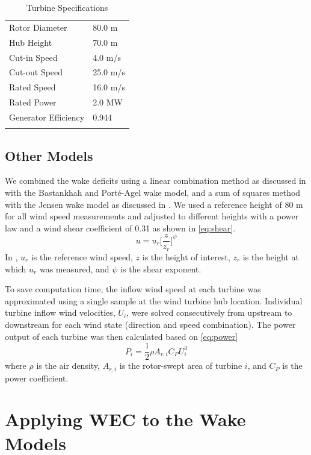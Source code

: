 \documentclass[a4paper]{jpconf}
\begin{document}
%
\begin{table}
	\caption{Turbine Specifications}
	\label{tab:v80}
	\centering
	\begin{tabular}{l l}
		\br
		Rotor Diameter & 80.0 m\\
		Hub Height & 70.0 m \\
		Cut-in Speed & 4.0 m/s\\
		Cut-out Speed & 25.0 m/s \\
		Rated Speed & 16.0 m/s \\
		Rated Power & 2.0 MW \\
		Generator Efficiency & 0.944 \\
		\br
	\end{tabular}
\end{table}

\subsection{Other Models}
We combined the wake deficits using a linear combination method as discussed in \cite{niayifar2016} with the Bastankhah and Port\'e-Agel wake model, and a sum of squares method with the Jensen wake model as discussed in \cite{katic1986}. We used a reference height of 80 m for all wind speed measurements and adjusted to different heights with a power law and a wind shear coefficient of 0.31 as shown in \cref{eq:shear}. 
%
\begin{equation} \label{eq:shear}
u = u_r\bigg[\frac{z}{z_r}\bigg]^\psi
\end{equation}
%
In , $u_r$ is the reference wind speed, $z$ is the height of interest, $z_r$ is the height at which $u_r$ was measured, and $\psi$ is the shear exponent.

To save computation time, the inflow wind speed at each turbine was approximated using a single sample at the wind turbine hub location. Individual turbine inflow wind velocities, $U_i$, were solved consecutively from upstream to downstream for each wind state (direction and speed combination). The power output of each turbine was then calculated based on \cref{eq:power}
%
\begin{equation}\label{eq:power}
P_i = \frac{1}{2}\rho A_{r,i}C_P U_i^3
\end{equation}
%
where $\rho$ is the air density, $A_{r,i}$ is the rotor-swept area of turbine $i$, and $C_P$ is the power coefficient. 

\section{Applying WEC to the  Wake Models}
\end{document}
